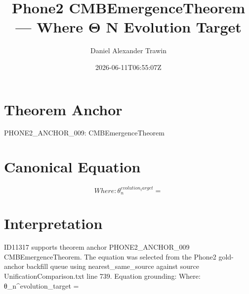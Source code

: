\documentclass[11pt]{article}
\title{Phone2 CMBEmergenceTheorem — Where Θ N Evolution Target}
\author{Daniel Alexander Trawin}
\date{2026-06-11T06:55:07Z}
\begin{document}
\maketitle
\section*{Theorem Anchor}
PHONE2_ANCHOR_009: CMBEmergenceTheorem
\section*{Canonical Equation}
\[
Where: θ_n^{evolution_target} =
\]
\section*{Interpretation}
ID11317 supports theorem anchor PHONE2_ANCHOR_009 CMBEmergenceTheorem. The equation was selected from the Phone2 gold-anchor backfill queue using nearest_same_source against source UnificationComparison.txt line 739. Equation grounding: Where: θ_n^{evolution_target} =
\end{document}
